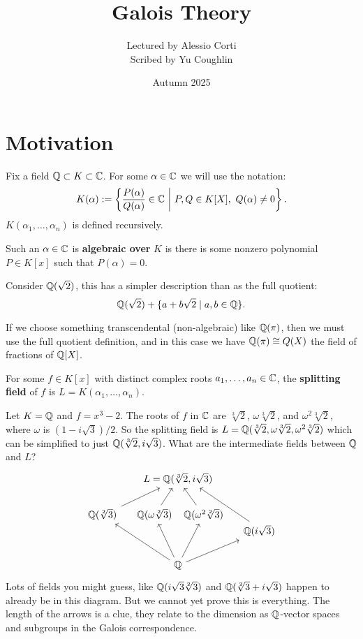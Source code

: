\documentclass{article}
\begin{document}
\title{Galois Theory}
\author{Lectured by Alessio Corti \\
Scribed by Yu Coughlin}
\date{Autumn 2025}

\maketitle

\tableofcontents

\section{Motivation}

Fix a field $\mathbb{Q}\subset K \subset \mathbb{C}$. For some $\alpha\in \mathbb{C}$ we will use the notation: \[
K(\alpha) := \left\{
    \frac{P(\alpha)}{Q(\alpha)} \in \bC \ \middle| \ P,Q\in K[X], \ Q(\alpha)\neq 0
\right\}.
\]
$K(\alpha_1,\ldots,\alpha_n)$ is defined recursively.

\begin{definition}
    Such an $\alpha\in \mathbb{C}$ is \textbf{algebraic over} $K$ is there is some nonzero polynomial $P\in K[x]$ such that $P(\alpha) = 0$.
\end{definition}

Consider $\mathbb{Q}(\sqrt{2})$, this has a simpler description than as the full quotient: \[
\mathbb{Q}(\sqrt{2}) + \{a + b\sqrt{2} \mid a,b\in\mathbb{Q}\}.
\]

If we choose something transcendental (non-algebraic) like $\mathbb{Q}(\pi)$, then we must use the full quotient definition, and in this case we have $\mathbb{Q}(\pi)\cong Q(X)$ the field of fractions of $\mathbb{Q}[X]$.

\begin{definition}
    For some $f\in K[x]$ with distinct complex roots $a_1,\ldots,a_n\in\mathbb{C}$, the \textbf{splitting field} of $f$ is $L=K(\alpha_1,\ldots,\alpha_n)$.
\end{definition}

Let $K=\mathbb{Q}$ and $f=x^3-2$. The roots of $f$ in $\mathbb{C}$ are $\sqrt[3]{2}$, $\omega \sqrt[3]{2}$, and $\omega^2\sqrt[3]{2}$, where $\omega$ is $(1-i\sqrt{3})/2$. So the splitting field is $L=\mathbb{Q}(\sqrt[3]{2},\omega\sqrt[3]{2},\omega^2\sqrt[3]{2})$ which can be simplified to just $\mathbb{Q}(\sqrt[3]{2},i\sqrt{3})$. What are the intermediate fields between $\mathbb{Q}$ and $L$? 
\vspace{-10pt}
\[
\begin{tikzcd}[column sep=small]
& &[-50pt] L = \bQ(\sqrt[3]{2},i\sqrt{3})\\
\bQ(\sqrt[2]{3}) \arrow[urr] 
& \bQ(\omega\sqrt[2]{3}) \arrow[ur] 
& &[-50pt] \bQ(\omega^2\sqrt[2]{3}) \arrow[ul]\\[-20pt]
& & & & \bQ(i\sqrt{3})\arrow[uull, end anchor={[xshift=-4ex]south east}]\\
& & \bQ \arrow[uull] \arrow[uul] \arrow[uur] \arrow[urr]
\end{tikzcd}
\] Lots of fields you might guess, like $\mathbb{Q}(i\sqrt{3}\sqrt[2]{3})$ and $\mathbb{Q}(\sqrt[2]{3} + i\sqrt{3})$ happen to already be in this diagram. But we cannot yet prove this is everything. The length of the arrows is a clue, they relate to the dimension as $\mathbb{Q}$-vector spaces and subgroups in the Galois correspondence.
\end{document}
